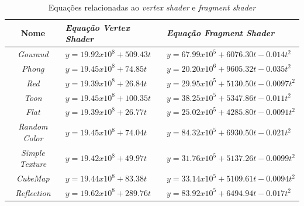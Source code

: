 	\begin{table}[ht]
	\centering	
	\begin{tabularx}{0.9\textwidth}{cXX}
		\toprule
		\textbf{Nome} & \textbf{\textit{Equação Vertex Shader}} & \textbf{\textit{Equação Fragment Shader}}  \\
		\midrule
		\textit{Gouraud} & $y = 19.92 x 10^8 + 509.43t$ & $y = 67.99 x 10 ^5 + 6076.30t - 0.014t^2$ \\
		\textit{Phong} &  $y = 19.45 x 10^8 + 74.85t$ & $y = 20.20 x 10^6 + 9605.32t - 0.035t^2$\\
		\textit{Red} & $y = 19.39 x 10^8 + 26.84t$ & $y = 29.95 x 10 ^5 + 5130.50t - 0.0097t^2$ \\
		\textit{Toon} & $y = 19.45 x 10^8 + 100.35t$ & $y = 38.25 x 10 ^5 + 5347.86t - 0.011t^2$ \\
		\textit{Flat} & $y = 19.39 x 10^8 + 26.77t$ & $y = 25.02 x 10 ^5 + 4285.80t - 0.0091t^2$ \\
		\textit{Random Color} & $y = 19.45 x 10^8 + 74.04t$ & $y = 84.32 x 10 ^5 + 6930.50t - 0.021t^2$ \\
		\textit{Simple Texture} & $y = 19.42 x 10^8 + 49.97t$ & $y = 31.76 x 10 ^5 + 5137.26t - 0.0099t^2$ \\
		\textit{CubeMap} & $y = 19.44 x 10^8 + 83.38t$ & $y = 33.14 x 10 ^5 + 5109.61t - 0.0094t^2$ \\
		\textit{Reflection} & $y = 19.62 x 10^8 + 289.76t$ & $y = 83.92 x 10 ^5 + 6494.94t - 0.017t^2$ \\
	
		\bottomrule
	\end{tabularx}
	\caption{Equações relacionadas ao \textit{vertex shader} e \textit{fragment shader}}
	\label{equacoes}
	\end{table}
